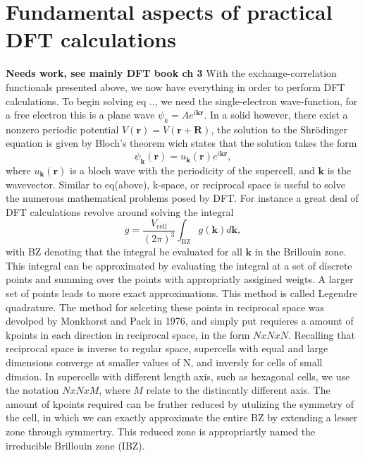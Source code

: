 \section{Fundamental aspects of practical DFT calculations}
\textbf{Needs work, see mainly DFT book ch 3}
With the exchange-correlation functionals presented above, we now have everything in order to perform DFT calculations. To begin solving eq .., we need the single-electron wave-function, for a free electron this is a plane wave $\psi_k = Ae^{i\boldsymbol{k}\boldsymbol{r}}$. In a solid however, there exist a nonzero periodic potential $V(\boldsymbol{r}) = V(\boldsymbol{r} + \boldsymbol{R})$, the solution to the Shr\"{o}dinger equation is given by Bloch's theorem wich states that the solution takes the form
\begin{equation}
\psi_{\boldsymbol{k}}(\boldsymbol{r}) = u_{\boldsymbol{k}}(\boldsymbol{r})e^{i\boldsymbol{k}\boldsymbol{r}},    
\end{equation}
where $u_{\boldsymbol{k}}(\boldsymbol{r})$ is a bloch wave with the periodicity of the supercell, and $\boldsymbol{k}$ is the wavevector. Similar to eq(above), k-space, or reciprocal space is useful to solve the numerous mathematical problems posed by DFT. For instance a great deal of DFT calculations revolve around solving the integral 
\begin{equation}
    g = \frac{V_{\text{cell}}}{(2\pi)^3} \int_{\text{BZ}} g(\boldsymbol{k})d\boldsymbol{k},
\end{equation}
with BZ denoting that the integral be evaluated for all $\boldsymbol{k}$ in the Brillouin zone. This integral can be approximated by evaluating the integral at a set of discrete points and summing over the points with appropriatly assigined weigts. A larger set of points leads to more exact approximations. This method is called Legendre quadrature. The method for selceting these points in reciprocal space was devolped by Monkhorst and Pack in 1976, and simply put requieres a amount of kpoints in each direction in reciprocal space, in the form $N x N x N$. Recalling that reciprocal space is inverse to regular space, supercells with equal and large dimensions converge at smaller values of N, and inversly for cells of small dimsion. In supercells with different length axis, such as hexagonal cells, we use the notation $N x N x M$, where $M$ relate to the distincntly different axis. The amount of kpoints required can be fruther reduced by utulizing the symmetry of the cell, in which we can exactly approximate the entire BZ by extending a lesser zone through symmertry. This reduced zone is appropriartly named the irreducible Brillouin zone (IBZ). 

